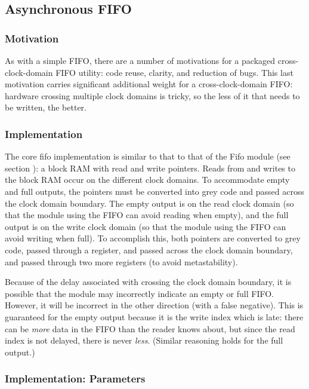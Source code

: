\documentclass[10pt]{article}
\begin{document}
\subsection{Asynchronous FIFO}

\label{sec:fifo}

\subsubsection{Motivation}

As with a simple FIFO, there are a number of motivations for a packaged
cross-clock-domain FIFO utility: code reuse, clarity, and reduction of bugs.
This last motivation carries significant additional weight for a
cross-clock-domain FIFO: hardware crossing multiple clock domains is tricky,
so the less of it that needs to be written, the better.

\subsubsection{Implementation}

The core fifo implementation is similar to that to that of the Fifo module
(see section \label{sec:syncfifo}): a block RAM with read and write
pointers.  Reads from and writes to the block RAM occur on the different
clock domains.  To accommodate empty and full outputs, the pointers must be
converted into grey code and passed across the clock domain boundary.  The
empty output is on the read clock domain (so that the module using the FIFO
can avoid reading when empty), and the full output is on the write clock
domain (so that the module using the FIFO can avoid writing when full).  To
accomplish this, both pointers are converted to grey code, passed through a
register, and passed across the clock domain boundary, and passed through
two more registers (to avoid metastability).

Because of the delay associated with crossing the clock domain boundary, it
is possible that the module may incorrectly indicate an empty or full FIFO. 
However, it will be incorrect in the other direction (with a false
negative).  This is guaranteed for the empty output because it is the write
index which is late: there can be \textit{more} data in the FIFO than the
reader knows about, but since the read index is not delayed, there is never
\textit{less}.  (Similar reasoning holds for the full output.)

\subsubsection{Implementation: Parameters}
\end{document}
